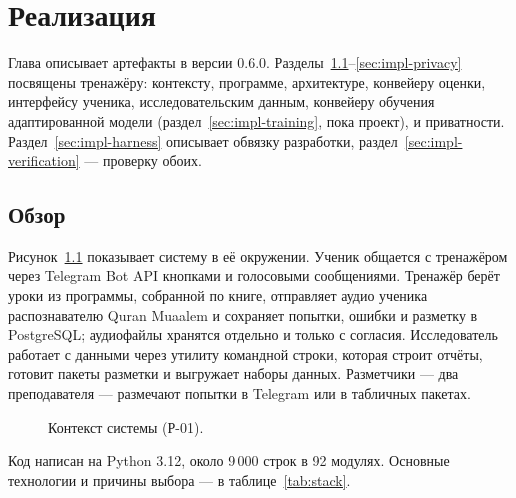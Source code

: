 \chapter{Реализация}\label{ch:impl}

Глава описывает артефакты в версии 0.6.0. Разделы~\ref{sec:impl-overview}--\ref{sec:impl-privacy}
посвящены тренажёру: контексту, программе, архитектуре, конвейеру оценки, интерфейсу ученика,
исследовательским данным, конвейеру обучения адаптированной модели (раздел~\ref{sec:impl-training},
пока проект), и приватности. Раздел~\ref{sec:impl-harness} описывает обвязку разработки,
раздел~\ref{sec:impl-verification} --- проверку обоих.

\section{Обзор}\label{sec:impl-overview}

Рисунок~\ref{fig:context} показывает систему в её окружении. Ученик общается с тренажёром через Telegram
Bot API кнопками и голосовыми сообщениями. Тренажёр берёт уроки из программы, собранной по книге,
отправляет аудио ученика распознавателю Quran Muaalem и сохраняет попытки, ошибки и разметку в
PostgreSQL; аудиофайлы хранятся отдельно и только с согласия. Исследователь работает с данными через
утилиту командной строки, которая строит отчёты, готовит пакеты разметки и выгружает наборы данных.
Разметчики --- два преподавателя --- размечают попытки в Telegram или в табличных пакетах.

\begin{figure}[ht]
\centering
\resizebox{0.95\linewidth}{!}{}
\caption{Контекст системы (Р-01).}\label{fig:context}
\end{figure}

Код написан на Python 3.12, около 9\,000 строк в 92 модулях. Основные технологии и причины выбора --- в
таблице~\ref{tab:stack}.

